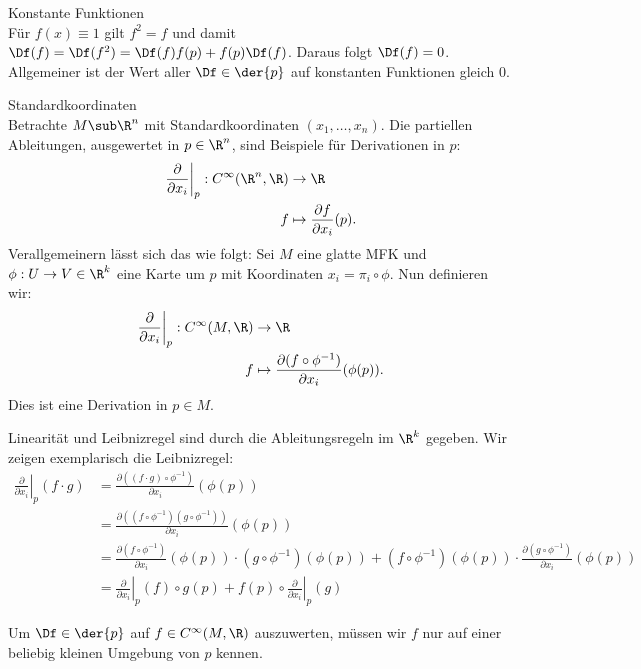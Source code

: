 \begin{bemerkung}Konstante Funktionen\\
Für $f(x) \equiv 1$ gilt $f^2 = f$ und damit $\Df (f) = \Df (f^2) = \Df (f) f(p) + f(p) \Df (f)$. Daraus folgt $\Df (f) = 0$. Allgemeiner ist der Wert aller $\Df \in \der{p}$ auf konstanten Funktionen gleich $0$.
\end{bemerkung}
\begin{beispiel}Standardkoordinaten\\
Betrachte $M \sub \R^n$ mit Standardkoordinaten $(x_1, \dots, x_n)$. Die partiellen Ableitungen, ausgewertet in $p \in \R^n$, sind Beispiele für Derivationen in $p$:
\begin{align}
\left.\frac{\partial}{\partial x_i}\right|_p : C^\infty (\R^n, \R) &\to \R \\
f &\mapsto \frac{\partial f}{\partial x_i}(p).
\end{align}
Verallgemeinern lässt sich das wie folgt: Sei $M$ eine glatte MFK und $\phi: U \to V \in \R^k$ eine Karte um $p$ mit Koordinaten $x_i = \pi_i \circ \phi$. Nun definieren wir:
\begin{align}
\left.\frac{\partial}{\partial x_i}\right|_p : C^\infty (M, \R) &\to \R \\
f &\mapsto \frac{\partial (f \circ \phi^{-1})}{\partial x_i}(\phi(p)).
\end{align}
Dies ist eine Derivation in $p \in M$.
\begin{beweis}
Linearität und Leibnizregel sind durch die Ableitungsregeln im $\R^k$ gegeben. Wir zeigen exemplarisch die Leibnizregel:
\begin{align}
\left. \frac{\partial}{\partial x_i}\right|_p (f \cdot g) &= \frac{\partial((f\cdot g)\circ \phi^{-1})}{\partial x_i} (\phi(p)) \\
&= \frac{\partial((f \circ \phi^{-1})( g \circ \phi^{-1}))}{\partial x_i} (\phi(p)) \\
&= \frac{\partial(f \circ \phi^{-1})}{\partial x_i}(\phi(p))\cdot (g \circ \phi^{-1})(\phi (p)) + (f \circ \phi^{-1}) (\phi (p)) \cdot \frac{\partial(g \circ \phi^{-1})}{\partial x_i}(\phi(p)) \\
&=\left.\frac{\partial}{\partial x_i}\right|_p (f) \circ g(p) + f(p) \circ \left.\frac{\partial}{\partial x_i}\right|_p (g)
\end{align}
\end{beweis}
\end{beispiel}
\begin{bemerkung}
Um $\Df \in \der{p}$ auf $f \in C^\infty (M, \R)$ auszuwerten, müssen wir $f$ nur auf einer beliebig kleinen Umgebung von $p$ kennen.
\end{bemerkung}
